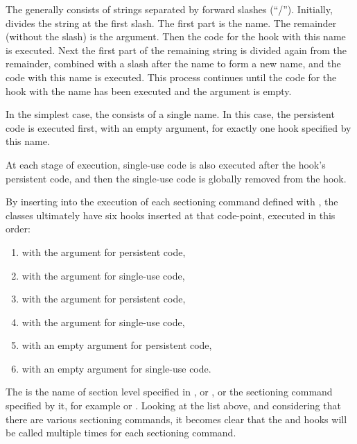The  generally consists of strings separated by forward
slashes (``/''). Initially,  divides the string at the
first slash. The first part is the name. The remainder (without the slash) is
the argument. Then the code for the hook with this name is executed. Next the
first part of the remaining string is divided again from the remainder,
combined with a slash after the name to form a new name, and the code with
this name is executed. This process continues until the code for the hook with
the name  has been executed and the argument is empty.

In the simplest case, the  consists of a single name. In this
case, the persistent code is executed first, with an empty argument, for
exactly one hook specified by this name.

At each stage of execution, single-use code is also executed after the hook's
persistent code, and then the single-use code is globally removed from the
hook.

\begin{Example}
  By inserting %
   into the execution of each
  sectioning command defined with
  , the \KOMAScript{}
  classes ultimately have six hooks inserted at that code-point, executed in
  this order:
  \begin{enumerate}
    \item {} with the argument 
    for persistent code,
    \item {} with the argument 
    for single-use code,
    \item {} with the argument  for
    persistent code,
    \item {} with the argument  for
    single-use code,
    \item {} with an empty argument for
    persistent code,
    \item {} with an empty argument for
    single-use code.
  \end{enumerate}
  The  is the name of section level specified in
  ,
   or
  , or the sectioning
  command specified by it, for example  or
  . Looking at the list above, and considering that there
  are various sectioning commands, it becomes clear that the 
  and  hooks will be called multiple times for each
  sectioning command.%
\end{Example}%
%
\EndIndexGroup

